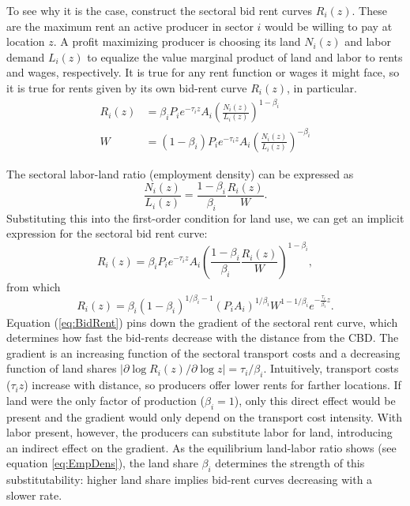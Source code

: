 \documentclass[12pt]{article}
\begin{document}
To see why it is the case, construct the sectoral bid rent curves $R_i(z)$. These are the maximum rent an active producer in sector $i$ would be willing to pay at location $z$. %
A profit maximizing producer is choosing its land $N_i(z)$ and labor demand $L_i(z)$ to equalize the value marginal product of land and labor to rents and wages, respectively. It is true for any rent function or wages it might face, so it is true for rents given by its own bid-rent curve $R_i(z)$, in particular.
\begin{align}
R_i(z) &=\beta_i P_ie^{-\tau_i z}A_i \left(\frac{N_i(z)}{L_i(z)}\right)^{1-\beta_i}\\
W &=(1-\beta_i) P_ie^{-\tau_i z}A_i \left(\frac{N_i(z)}{L_i(z)}\right)^{-\beta_i}
\end{align}

The sectoral labor-land ratio (employment density) can be expressed as
\begin{equation}
\label{eq:EmpDens}
\frac{N_i(z)}{L_i(z)} = \frac{1-\beta_i}{\beta_i}\frac{R_i(z)}{W}.
\end{equation}
Substituting this into the first-order condition for land use, we can get an implicit expression for the sectoral bid rent curve:
\[
R_i(z) =\beta_i P_ie^{-\tau_i z}A_i \left(\frac{1-\beta_i}{\beta_i}\frac{R_i(z)}{W}\right)^{1-\beta_i},
\]
from which
\begin{equation}
\label{eq:BidRent}
R_i(z) =\beta_i(1-\beta_i)^{1/\beta_i-1} (P_iA_i)^{1/\beta_i} W^{1-1/\beta_i} e^{-\frac{\tau_i}{\beta_i} z}.
\end{equation}
Equation (\ref{eq:BidRent}) pins down the gradient of the sectoral rent curve, which determines how fast the bid-rents decrease with the distance from the CBD. The gradient is an increasing function of the sectoral transport costs and a decreasing function of land shares $|\partial\log R_i(z)/\partial \log z|=\tau_i/\beta_i$. Intuitively, transport costs ($\tau_iz$) increase with distance, so producers offer lower rents for farther locations. If land were the only factor of production ($\beta_i=1$), only this direct effect would be present and the gradient would only depend on the transport cost intensity. With labor present, however, the producers can substitute labor for land, introducing an indirect effect on the gradient. As the equilibrium land-labor ratio shows (see equation \ref{eq:EmpDens}), the land share $\beta_i$ determines the strength of this substitutability: higher land share implies bid-rent curves decreasing with a slower rate.
\end{document}
